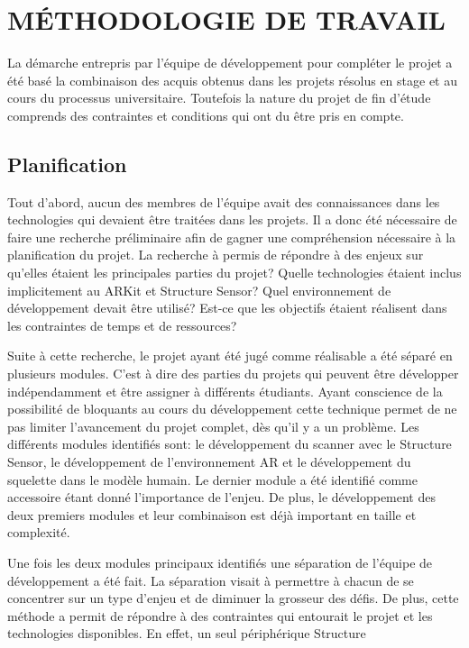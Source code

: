 \documentclass[letterpaper,twoside,12pt,french]{report}
\begin{document}
\chapter*{\uppercase{Méthodologie de travail}}
La démarche entrepris par l’équipe de développement pour compléter le projet a été basé la
combinaison des acquis obtenus dans les projets résolus en stage et au cours du processus
universitaire. Toutefois la nature du projet de fin d’étude comprends des contraintes et conditions
qui ont du être pris en compte.
\section*{Planification}
Tout d’abord, aucun des membres de l’équipe avait des connaissances dans les technologies qui
devaient être traitées dans les projets. Il a donc été nécessaire de faire une recherche
préliminaire afin de gagner une compréhension nécessaire à la planification du projet. La
recherche à permis de répondre à des enjeux sur qu’elles étaient les principales parties du projet?
Quelle technologies étaient inclus implicitement au ARKit et Structure Sensor? Quel environnement
de développement devait être utilisé? Est-ce que les objectifs étaient réalisent dans les
contraintes de temps et de ressources?
\par
Suite à cette recherche, le projet ayant été jugé comme réalisable a été séparé en plusieurs modules.
C’est à dire des parties du projets qui peuvent être développer indépendamment et être assigner à
différents étudiants. Ayant conscience de la possibilité de bloquants au cours du développement
cette technique permet de ne pas limiter l’avancement du projet complet, dès qu’il y a un problème.
Les différents modules identifiés sont: le développement du scanner avec le Structure Sensor, le
développement de l’environnement AR et le développement du squelette dans le modèle humain. Le
dernier module a été identifié comme accessoire étant donné l’importance de l’enjeu. De plus, le
développement des deux premiers modules et leur combinaison est déjà important en taille et
complexité.
\par
Une fois les deux modules principaux identifiés une séparation de l'équipe de développement a été
fait. La séparation visait à permettre à chacun de se concentrer sur un type d'enjeu et de
diminuer la grosseur des défis. De plus, cette méthode a permit de répondre à des contraintes qui
entourait le projet et les technologies disponibles. En effet, un seul périphérique Structure
\end{document}

